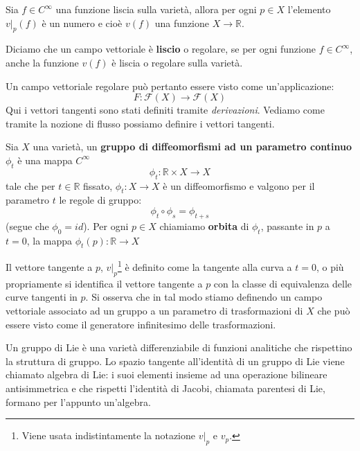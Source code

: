 Sia $f \in C^\infty$ una funzione liscia sulla varietà, allora per ogni $p\in X$ l'elemento $v|_p(f)$ è un numero e cioè $v(f)$ una funzione $X \rightarrow \mathbb{R}$.
\begin{definizione}
Diciamo che un campo vettoriale è \textbf{liscio} o regolare, se per ogni funzione $f\in C^\infty$, anche la funzione $v(f)$ è liscia o regolare sulla varietà.
\end{definizione}
Un campo vettoriale regolare può pertanto essere visto come un'applicazione:
\begin{equation*}
    F: \mathcal{F}(X) \rightarrow \mathcal{F}(X)
\end{equation*}
Qui i vettori tangenti sono stati definiti tramite \textit{derivazioni}.
Vediamo come tramite la nozione di flusso possiamo definire i vettori tangenti.
\begin{definizione}
Sia $X$ una varietà, un \textbf{gruppo di diffeomorfismi ad un parametro continuo} $\phi_t$ è una mappa $C^\infty$
\begin{equation*}
    \phi_t : \mathbb{R} \times X \rightarrow X
\end{equation*}
tale che per $t \in \mathbb{R}$ fissato, $\phi_t : X \rightarrow X$ è un diffeomorfismo e valgono per il parametro $t$ le regole di gruppo:
\begin{equation*}
    \phi_t \circ \phi_s = \phi_{t+s}
\end{equation*}
(segue che $\phi_0 = id$).
Per ogni $p\in X$ chiamiamo \textbf{orbita} di $\phi_t$, passante in $p$ a $t=0$, la mappa $\phi_t(p): \mathbb{R} \rightarrow X$ 
\end{definizione}
Il vettore tangente a $p$, $v|_p$\footnote{Viene usata indistintamente la notazione $v|_p$ e $v_p$.} è definito come la tangente alla curva a $t=0$, o più propriamente si identifica il vettore tangente a $p$ con la classe di equivalenza delle curve tangenti in $p$.
Si osserva che in tal modo stiamo definendo un campo vettoriale associato ad un gruppo a un parametro di trasformazioni di $X$ che può essere visto come il generatore infinitesimo delle trasformazioni.

\begin{esempio}
Un gruppo di Lie è una varietà differenziabile di funzioni analitiche che rispettino la struttura di gruppo. Lo spazio tangente all'identità di un gruppo di Lie viene chiamato algebra di Lie: i suoi elementi insieme ad una operazione bilineare antisimmetrica e che rispetti l'identità di Jacobi, chiamata parentesi di Lie, formano per l'appunto un'algebra.
\end{esempio}

